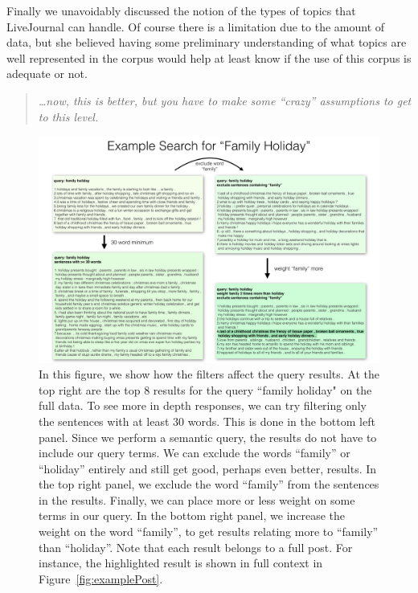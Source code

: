 \documentclass{sigchi}
\begin{document}
Finally we unavoidably discussed the notion of the types of topics that LiveJournal can handle. Of course there is a limitation due to the amount of data, but she believed having some preliminary understanding of what topics are well represented in the corpus would help at least know if the use of this corpus is adequate or not.

\begin{quote}
{\em
\dots now, this is better, but you have to make some ``crazy'' assumptions to get to this level.
}\end{quote}


\begin{figure}[ht]
\centering \includegraphics[width=.85\textwidth]{figures/results_1}
\caption{In this figure, we show how the filters affect the query results. 
At the top right are the top 8 results for the query ``family holiday" on the full data.  
To see more in depth responses, we can try filtering only the sentences with at least 30 words. 
This is done in the bottom left panel. 
Since we perform a semantic query, the results do not have to include our query terms. 
We can exclude the words ``family'' or ``holiday''  entirely and still get good, perhaps even better, results.
In the top right panel, we exclude the word ``family'' from the sentences in the results.
Finally, we can place more or less weight on some terms in our query. 
In the bottom right panel, we increase the weight on the word ``family'', 
to get results relating more to ``family'' than ``holiday''.  
Note that each result belongs to a full post. For instance, the highlighted result is shown in full context in Figure~\ref{fig:examplePost}. 
\label{fig:familyHolidays} }
\end{figure}
\end{document}
